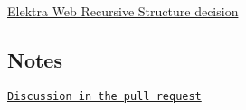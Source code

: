 \begin{DoxyItemize}
\item \hyperlink{doc_decisions_elektra_web_recursive_md}{Elektra Web Recursive Structure decision}
\end{DoxyItemize}

\subsection*{Notes}


\begin{DoxyItemize}
\item \href{https://github.com/ElektraInitiative/libelektra/pull/1173}{\tt Discussion in the pull request} 
\end{DoxyItemize}